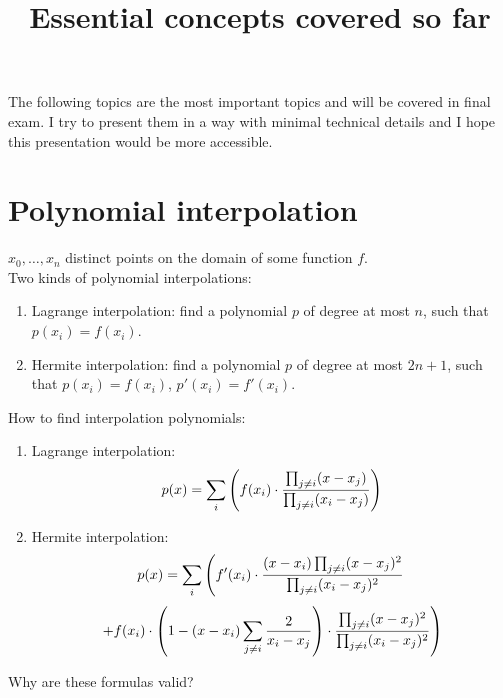 \documentclass[20pt]{article} %
\title{Essential concepts covered so far}
\theoremstyle{break}
\begin{document}
\maketitle

The following topics are the most important topics and will be covered in final exam. I try to present them in a way with minimal technical details and I hope this presentation would be more accessible.

  \newpage

  \section{Polynomial interpolation}

  $x_0, \dots, x_n$ distinct points on the domain of some function $f$.\\
  
  Two kinds of polynomial interpolations:
  \begin{enumerate}
  \item Lagrange interpolation: find a polynomial $p$ of degree at most $n$, such that $p(x_i)=f(x_i)$.
  \item Hermite interpolation: find a polynomial $p$ of degree at most $2n+1$, such that $p(x_i)=f(x_i)$, $p'(x_i)=f'(x_i)$.
  \end{enumerate}

  \newpage

  How to find interpolation polynomials:

  \begin{enumerate}
  \item Lagrange interpolation:
    \[p(x)=\sum_i\left( f(x_i)\cdot {\prod_{j\not=i}(x-x_j)\over \prod_{j\not=i}(x_i-x_j)}\right)\]
  \item Hermite interpolation:
 \[p(x)=\sum_i\left( f'(x_i)\cdot {(x-x_i)\prod_{j\not=i}(x-x_j)^2\over \prod_{j\not=i}(x_i-x_j)^2}\right. \]
  \[\left. +f(x_i)\cdot \left(1-(x-x_i)\sum_{j\not=i}{2\over x_i-x_j}\right)\cdot {\prod_{j\not=i}(x-x_j)^2\over \prod_{j\not=i}(x_i-x_j)^2} \right)\]
 \end{enumerate}

\newpage

Why are these formulas valid?
\end{document}
